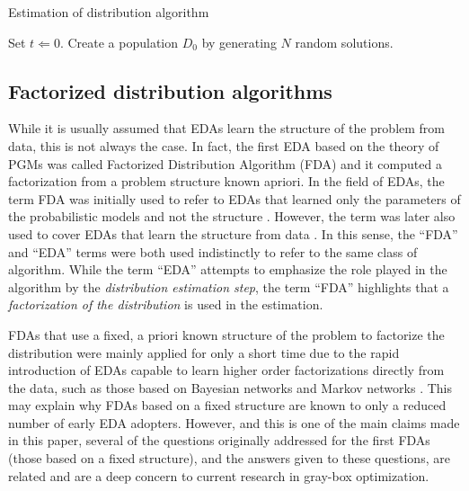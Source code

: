 \documentclass{article} %
\begin{document}
\small
\begin{BAlgo}{Estimation of distribution algorithm}
	\label{alg:EDA}
	\item Set $t\Leftarrow 0$. Create a population $D_0$ by generating $N$ random solutions.
	\item \Do
	\item {}
	\item {}
	\item {}
	\item {}
	\item {}
	\item  {}
\end{BAlgo}
\normalsize


\subsection{Factorized distribution algorithms} 

 While it is usually assumed that EDAs learn the structure of the problem from data, this is not always the case. In fact, the first EDA based on the theory of PGMs was called Factorized Distribution Algorithm (FDA) \cite{Muhlenbein_et_al:1999} and it computed a factorization from a problem structure known  apriori. In the field of EDAs, the term FDA was initially used to refer to EDAs that  learned only the parameters of the  probabilistic models and not the structure  \cite{Muhlenbein_and_Mahnig:1998,Muhlenbein_and_Mahnig:1999a,Muhlenbein_and_Mahnig:1999,Santana_et_al:1999,Santana_et_al:2001c,Zhang:2004}. However, the term was later also used to cover EDAs that learn the structure from data \cite{Mahnig:2001b,Muehlenbein_and_Hoens:2006,Muehlenbein_and_Mahnig:2002,Ochoa_et_al:2000a,Ochoa_et_al:1999,Santana:2003c,Santana_et_al:2001b}. In this sense, the ``FDA'' and ``EDA'' terms were both used indistinctly to refer to the same class of algorithm. While the term ``EDA'' attempts to emphasize the role played in the algorithm by the \emph{distribution estimation step}, the term ``FDA'' highlights that a \emph{factorization of the distribution}  is used in the estimation.  

 FDAs that use a fixed, a priori known structure of the problem to factorize the distribution were mainly applied for only a short time due to the rapid introduction of EDAs capable to learn higher order factorizations directly from the data, such as those based on Bayesian networks \cite{Etxeberria_and_Larranhaga:1999,Larranhaga_et_al:1999,Pelikan_et_al:1999,Soto_et_al:1999} and Markov networks \cite{Alden_and_Miikkulainen:2016,Santana:2003c,Shakya_and_McCall:2007}. This may explain why FDAs based on a fixed structure are known to only a reduced number of early EDA adopters. However, and this is one of the main claims made in this paper, several of the questions originally addressed for the first FDAs (those based on a fixed structure), and the answers given to these questions, are related and are a deep concern to current research in gray-box optimization. 
\end{document}
